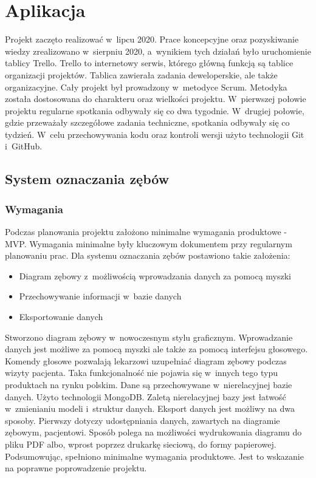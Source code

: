 \chapter{Aplikacja}
Projekt zaczęto realizować w~lipcu 2020. Prace koncepcyjne oraz pozyskiwanie wiedzy zrealizowano w~sierpniu 2020, a~wynikiem tych działań było uruchomienie tablicy Trello. Trello to internetowy serwis, którego główną funkcją są tablice organizacji projektów. Tablica zawierała zadania deweloperskie, ale także organizacyjne. Cały projekt był prowadzony w~metodyce Scrum. Metodyka została dostosowana do charakteru oraz wielkości projektu. W~pierwszej połowie projektu regularne spotkania odbywały się co dwa tygodnie. W~drugiej połowie, gdzie przeważały szczegółowe zadania techniczne, spotkania odbywały się co tydzień. W~celu przechowywania kodu oraz kontroli wersji użyto technologii Git i~GitHub.
\section{System oznaczania zębów}
\subsection{Wymagania}
Podczas planowania projektu założono minimalne wymagania produktowe - MVP. Wymagania minimalne były kluczowym dokumentem przy regularnym planowaniu prac. Dla systemu oznaczania zębów postawiono takie założenia:
\begin{itemize}
    \item Diagram zębowy z~możliwością wprowadzania danych za pomocą myszki
    \item Przechowywanie informacji w~bazie danych
    \item Eksportowanie danych
\end{itemize} 
Stworzono diagram zębowy w~nowoczesnym stylu graficznym. Wprowadzanie danych jest możliwe za pomocą myszki ale także za pomocą interfejsu głosowego. Komendy głosowe pozwalają lekarzowi uzupełniać diagram zębowy podczas wizyty pacjenta. Taka funkcjonalność nie pojawia się w~innych tego typu produktach na rynku polskim. Dane są przechowywane w~nierelacyjnej bazie danych. Użyto technologii MongoDB. Zaletą nierelacyjnej bazy jest łatwość w~zmienianiu modeli i~struktur danych. Eksport danych jest możliwy na dwa sposoby. Pierwszy dotyczy udostępniania danych, zawartych na diagramie zębowym, pacjentowi. Sposób polega na możliwości wydrukowania diagramu do pliku PDF albo, wprost poprzez drukarkę sieciową, do formy papierowej. Podsumowując, spełniono minimalne wymagania produktowe. Jest to wskazanie na poprawne poprowadzenie projektu. 


